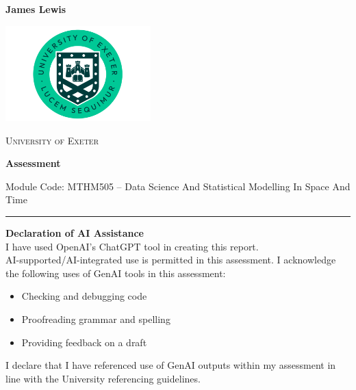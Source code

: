 \documentclass[
  11pt,
]{article}
\author{}
\date{}
\begin{document}
\begin{titlepage}
    \noindent
    \begin{flushleft}
        \textbf{James Lewis} \\
    \end{flushleft}

    \vspace*{0.8cm}
    \centering

    \centering
    \vspace*{1.5cm}

    \includegraphics[width=0.42\textwidth]{Uni-Exeter-logo-portrait-1.png}\par\vspace{1.2cm}

    {\scshape\Large University of Exeter \par}
    \vspace{1.2cm}

    {\Huge\bfseries Assessment \par}
    \vspace{0.6cm}

    {\large Module Code: MTHM505 – Data Science And Statistical Modelling In Space And Time\par}
    
    \vspace*{0.8cm}

    \small
    \noindent\rule{\textwidth}{0.4pt}
    \vspace{0.2cm}

    \textbf{Declaration of AI Assistance} \\
    I have used OpenAI’s ChatGPT tool in creating this report. \\

    AI-supported/AI-integrated use is permitted in this assessment. I acknowledge the following uses of GenAI tools in this assessment:

    \begin{itemize}\itemsep0pt  
      \item Checking and debugging code
      \item Proofreading grammar and spelling
      \item Providing feedback on a draft
    \end{itemize}

    \vspace{-0.2cm}
    I declare that I have referenced use of GenAI outputs within my assessment in line with the University referencing guidelines.

\end{titlepage}
\end{document}
